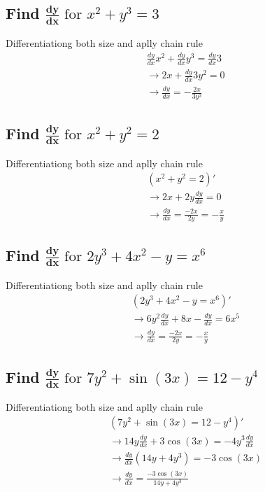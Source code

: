 \documentclass{article}
\begin{document}
\begin{multicols}{2}

\subsection{Find $\mathbf{\frac{dy}{dx}} \text{ for } x^2+y^3=3$}
\noindent Differentiationg both size and aplly chain rule
\begin{align*}
    & \frac{dy}{dx}x^2 + \frac{dy}{dx}y^3 = \frac{dy}{dx}3\\
    &\rightarrow 2x + \frac{dy}{dx}3y^2 = 0\\
    &\rightarrow \frac{dy}{dx} = -\frac{2x}{3y^2}
\end{align*}

\subsection{Find $\mathbf{\frac{dy}{dx}} \text{ for } x^2+y^2=2$}
\noindent Differentiationg both size and aplly chain rule
\begin{align*}
    &(x^2+y^2=2)' \\
    &\rightarrow 2x+2y\frac{dy}{dx}=0 \\
    &\rightarrow \frac{dy}{dx} = \frac{-2x}{2y} = -\frac{x}{y}
\end{align*}

\subsection{Find $\mathbf{\frac{dy}{dx}} \text{ for } 2y^3+4x^2-y=x^6$}
\noindent Differentiationg both size and aplly chain rule
\begin{align*}
    &(2y^3+4x^2-y=x^6)' \\
    &\rightarrow 6y^2\frac{dy}{dx} +8x- \frac{dy}{dx}=6x^5 \\
    &\rightarrow \frac{dy}{dx} = \frac{-2x}{2y} = -\frac{x}{y}
\end{align*}

\subsection{Find $\mathbf{\frac{dy}{dx}} \text{ for } 7y^2+\sin(3x)=12-y^4$}
\noindent Differentiationg both size and aplly chain rule
\begin{align*}
    &(7y^2+\sin(3x)=12-y^4)' \\
    &\rightarrow 14y\frac{dy}{dx} + 3\cos(3x)=-4y^3\frac{dy}{dx} \\
    &\rightarrow \frac{dy}{dx}(14y+4y^3)=-3\cos(3x) \\
    &\rightarrow \frac{dy}{dx}= \frac{-3\cos(3x)}{14y+4y^3}
\end{align*}


\end{multicols}
\end{document}
